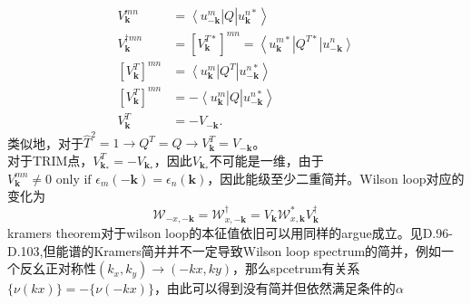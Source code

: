 \documentclass[10pt,openany]{book}
\theoremstyle{thmstyle} %
\theoremstyle{defstyle} %
\theoremstyle{prostyle} %
\begin{document}
\begin{equation}
  \begin{aligned}
    V_{\mathbf{k}}^{m n} & =\left\langle u_{-\mathbf{k}}^m\right| Q\left|u_{\mathbf{k}}^{n *}\right\rangle \\
    V_{\mathbf{k}}^{\dagger m n} & =\left[V_{\mathbf{k}}^{T *}\right]^{m n}=\left\langle u_{\mathbf{k}}^{m *}\right| Q^{T *}\left|u_{-\mathbf{k}}^n\right\rangle \\
    {\left[V_{\mathbf{k}}^T\right]^{m n} } & =\left\langle u_{\mathbf{k}}^m\right| Q^T\left|u_{-\mathbf{k}}^{n *}\right\rangle \\
    {\left[V_{\mathbf{k}}^T\right]^{m n} } & =-\left\langle u_{\mathbf{k}}^m\right| Q\left|u_{-\mathbf{k}}^{n *}\right\rangle \\
    V_{\mathbf{k}}^T & =-V_{-\mathbf{k}} .
    \end{aligned}
\end{equation}
类似地，对于$ \hat{T}^2=1\to Q^T=Q\to V_{\mathbf{k}}^T  =V_{-\mathbf{k}} $。\\
对于TRIM点，$ V_{\mathbf{k}_*}^T=-V_{\mathbf{k}_*} $，因此$ V_{\mathbf{k}_*} $不可能是一维，由于$ V_{\mathbf{k}}^{m n} \neq 0 \text { only if } \epsilon_m(-\mathbf{k})=\epsilon_n(\mathbf{k}) $，因此能级至少二重简并。Wilson loop对应的变化为
\begin{equation}
  \mathcal{W}_{-x,-\mathbf{k}}=\mathcal{W}_{x,-\mathbf{k}}^{\dagger}=V_{\mathbf{k}} \mathcal{W}_{x, \mathbf{k}}^* V_{\mathbf{k}}^{\dagger}
\end{equation}
kramers theorem对于wilson loop的本征值依旧可以用同样的argue成立。见D.96-D.103,但能谱的Kramers简并并不一定导致Wilson loop spectrum的简并，例如一个反幺正对称性$ (k_x,k_y)\to(-kx,ky) $，那么spcetrum有关系$ \{\nu(kx)\} = - \{\nu(-kx)\} $，由此可以得到没有简并但依然满足条件的$ \alpha $          
\end{document}
